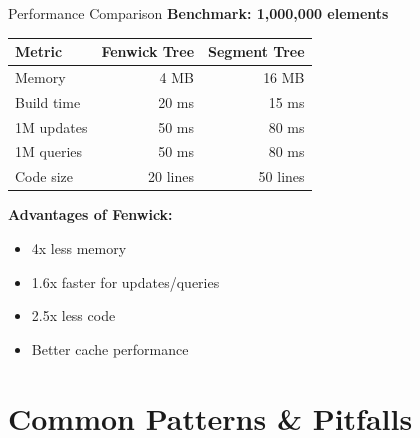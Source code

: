 \documentclass[aspectratio=169]{beamer}
\begin{document}
\begin{frame}{Performance Comparison}
  \textbf{Benchmark: 1,000,000 elements}

  \vspace{0.3cm}
  \begin{table}
    \centering
    \begin{tabular}{|l|r|r|}
      \hline
      \textbf{Metric} & \textbf{Fenwick Tree} & \textbf{Segment Tree} \\
      \hline
      Memory & 4 MB & 16 MB \\
      \hline
      Build time & ~20 ms & ~15 ms \\
      \hline
      1M updates & ~50 ms & ~80 ms \\
      \hline
      1M queries & ~50 ms & ~80 ms \\
      \hline
      Code size & ~20 lines & ~50 lines \\
      \hline
    \end{tabular}
  \end{table}

  \vspace{0.5cm}
  \textbf{Advantages of Fenwick:}
  \begin{itemize}
    \item 4x less memory
    \item 1.6x faster for updates/queries
    \item 2.5x less code
    \item Better cache performance
  \end{itemize}
\end{frame}

\section{Common Patterns \& Pitfalls}
\end{document}
